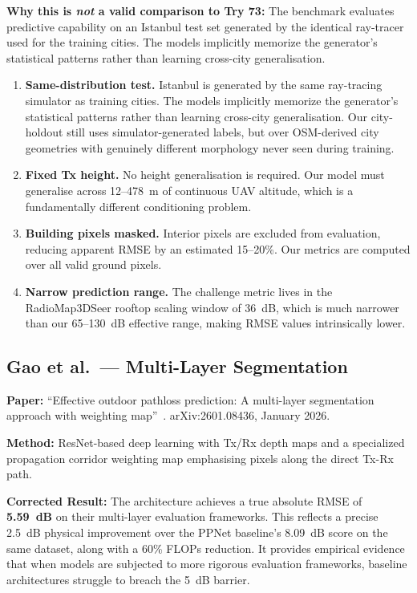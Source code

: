 \documentclass[11pt,a4paper]{article}
\begin{document}
\textbf{Why this is \emph{not} a valid comparison to Try 73:} The benchmark evaluates predictive capability on an Istanbul test set generated by the identical ray-tracer used for the training cities. The models implicitly memorize the generator's statistical patterns rather than learning cross-city generalisation.
\begin{enumerate}[nosep]
    \item \textbf{Same-distribution test.} Istanbul is generated by the same
          ray-tracing simulator as training cities. The models implicitly memorize
          the generator's statistical patterns rather than learning cross-city
          generalisation. Our city-holdout still uses simulator-generated labels,
          but over OSM-derived city geometries with genuinely different morphology
          never seen during training.

    \item \textbf{Fixed Tx height.} No height generalisation is required.
          Our model must generalise across 12--478~m of continuous UAV altitude,
          which is a fundamentally different conditioning problem.

    \item \textbf{Building pixels masked.} Interior pixels are excluded from
          evaluation, reducing apparent RMSE by an estimated 15--20\%. Our metrics
          are computed over all valid ground pixels.

    \item \textbf{Narrow prediction range.} The challenge metric lives in the
          RadioMap3DSeer rooftop scaling window of 36~dB, which is much narrower
          than our 65--130~dB effective range, making RMSE values intrinsically lower.
\end{enumerate}

\subsection{Gao et al.\ --- Multi-Layer Segmentation}

\textbf{Paper:} ``Effective outdoor pathloss prediction: A multi-layer segmentation
approach with weighting map''~\cite{gao2026}. arXiv:2601.08436, January 2026.

\textbf{Method:} ResNet-based deep learning with Tx/Rx depth maps and a specialized propagation corridor weighting map emphasising pixels along the direct Tx-Rx path.

\textbf{Corrected Result:} The architecture achieves a true absolute RMSE of \textbf{5.59~dB} on their multi-layer evaluation frameworks. This reflects a precise 2.5~dB physical improvement over the PPNet baseline's 8.09~dB score on the same dataset, along with a 60\% FLOPs reduction. It provides empirical evidence that when models are subjected to more rigorous evaluation frameworks, baseline architectures struggle to breach the 5~dB barrier.
\end{document}
